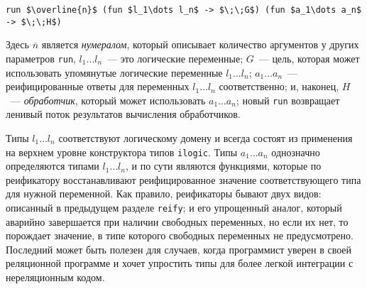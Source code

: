 \begin{lstlisting}[mathescape=true]
   run $\overline{n}$ (fun $l_1\dots l_n$ -> $\;\;G$) (fun $a_1\dots a_n$ -> $\;\;H$)
\end{lstlisting}
\noindent Здесь $\overline{n}$ является \emph{нумералом}, который описывает количество аргументов у других параметров \lstinline|run|,
\mbox{$l_1\dots l_n$}~--- это логические переменные;
$G$~--- цель, которая может использовать упомянутые логические переменные \mbox{$l_1\dots l_n$};
\mbox{$a_1\dots a_n$}~---  реифицированные ответы для переменных \mbox{$l_1\dots l_n$} соответственно; и,
наконец, $H$~--- \emph{обработчик}, который может использовать \mbox{$a_1\dots a_n$};
новый \lstinline|run| возвращает ленивый поток результатов вычисления обработчиков.



Типы \mbox{$l_1\dots l_n$} соответствуют логическому домену и всегда состоят из применения на верхнем уровне конструктора типов \lstinline|ilogic|.
%
%
Типы \mbox{$a_1\dots a_n$} однозначно определяются типами \mbox{$l_1\dots l_n$}, и по сути являются функциями, которые по реификатору восстанавливают реифицированное значение соответствующего типа для нужной переменной.
Как правило, реификаторы бывают двух видов: описанный в предыдущем разделе \lstinline|reify|; и его упрощенный аналог, который аварийно завершается при наличии свободных переменных, но если их нет, то порождает значение, в типе которого свободных переменных не предусмотрено.
Последний может быть полезен для случаев, когда программист уверен в своей реляционной программе и хочет упростить типы для более легкой интеграции с нереляционным кодом.

